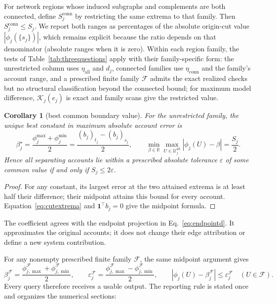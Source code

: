 \documentclass[a4paper,fleqn]{cas-sc}
\newtheorem{corollary}[theorem]{Corollary}
\begin{document}
For network regions whose induced subgraphs and complements are both
connected, define $S_j^{\mathrm{conn}}$ by restricting the same extrema to
that family. Then $S_j^{\mathrm{conn}}\le S_j$. We report both
ranges as percentages of the absolute origin-cut value
$|\phi_j(\{s_j\})|$, which remains explicit because the ratio depends
on that denominator (absolute ranges when it is zero). Within each
region family, the tests of Table~\ref{tab:threequestions} apply with
their family-specific form: the unrestricted column uses
$\eta_{\mathrm{all}}$ and $d_j$, connected families use
$\eta_{\mathrm{conn}}$ and the family's account range, and a
prescribed finite family $\mathcal F$ admits the exact realized checks
but no structural classification beyond the connected bound; for
maximum model difference, $\mathcal K_j(e_j)$ is exact and family
scans give the restricted value.

\begin{corollary}[best common boundary value]\label{cor:approxinterchange}
For the unrestricted family, the unique best constant in maximum absolute
account error is
\[
\beta_j^\star=\frac{\phi_j^{\max}+\phi_j^{\min}}2
=\frac{(b_j)_{t_j}-(b_j)_{s_j}}2,\qquad
\min_{\beta\in\mathbb R}\max_{U\in\mathcal U_j^{\mathrm{all}}}
|\phi_j(U)-\beta|=\frac{S_j}{2}.
\]
Hence all separating accounts lie within a prescribed absolute tolerance
$\varepsilon$ of some common value if and only if $S_j\le2\varepsilon$.
\end{corollary}
\begin{proof}
For any constant, its largest error at the two attained extrema is at least
half their difference; their midpoint attains this bound for every account.
Equation~\eqref{eq:cutextrema} and $\mathbf1^\top b_j=0$ give the midpoint formula.
\end{proof}
The coefficient agrees with the endpoint projection in
Eq.~\eqref{eq:endpointd}. It approximates the original accounts; it does
not change their edge attribution or define a new system contribution.

For any nonempty prescribed finite family $\mathcal F$, the same midpoint argument gives
\begin{equation}
\beta_j^{\mathcal F}=\frac{\phi_{j,\max}^{\mathcal F}+\phi_{j,\min}^{\mathcal F}}2,
\qquad \varepsilon_j^{\mathcal F}=\frac{\phi_{j,\max}^{\mathcal F}-\phi_{j,\min}^{\mathcal F}}2,
\qquad |\phi_j(U)-\beta_j^{\mathcal F}|\le\varepsilon_j^{\mathcal F}\quad(U\in\mathcal F).
\label{eq:familycommon}
\end{equation}
Every query therefore receives a usable output. The reporting rule is
stated once and organizes the numerical sections:
\end{document}
